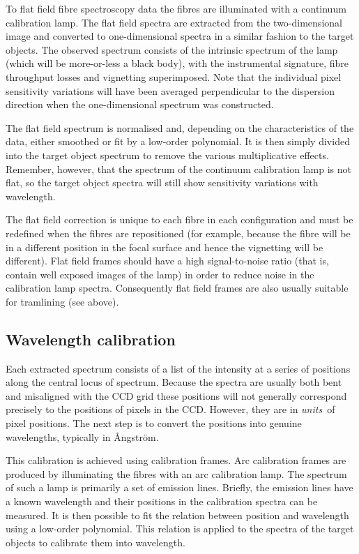 \documentclass[twoside,11pt]{starlink}
\begin{document}
To flat field fibre spectroscopy data the fibres are illuminated with a
continuum calibration lamp.  The flat field spectra are extracted from
the two-dimensional image and converted to one-dimensional spectra in a
similar fashion to the target objects.  The observed spectrum consists
of the intrinsic spectrum of the lamp (which will be more-or-less a
black body), with the instrumental signature, fibre throughput losses
and vignetting superimposed.  Note that the individual pixel sensitivity
variations will have been averaged perpendicular to the dispersion
direction when the one-dimensional spectrum was constructed.

The flat field spectrum is normalised and, depending on the characteristics
of the data, either smoothed or fit by a low-order polynomial.  It is then
simply divided into the target object spectrum to remove the various
multiplicative effects.  Remember, however, that the spectrum of the
continuum calibration lamp is not flat, so the target object spectra will
still show sensitivity variations with wavelength.

The flat field correction is unique to each fibre in each configuration
and must be redefined when the fibres are repositioned (for example,
because the fibre will be in a different position in the focal surface
and hence the vignetting will be different).  Flat field frames should
have a high signal-to-noise ratio (that is, contain well exposed images
of the lamp) in order to reduce noise in the calibration lamp spectra.
Consequently flat field frames are also usually suitable for tramlining
(see above).

\subsection{\label{WAVEC}Wavelength calibration}

Each extracted spectrum consists of a list of the intensity at a series
of positions along the central locus of spectrum.  Because the spectra
are usually both bent and misaligned with the CCD grid these positions
will not generally correspond precisely to the positions of pixels in
the CCD.  However, they are in \textit{units}\, of pixel positions.  The
next step is to convert the positions into genuine wavelengths,
typically in \AA ngstr\"{o}m.

This calibration is achieved using calibration frames.  Arc calibration
frames are produced by illuminating the fibres with an arc calibration
lamp.  The spectrum of such a lamp is primarily a set of emission lines.
Briefly, the emission lines have a known wavelength and their positions
in the calibration spectra can be measured.  It is then possible to fit
the relation between position and wavelength using a low-order
polynomial.  This relation is applied to the spectra of the target
objects to calibrate them into wavelength.
\end{document}
